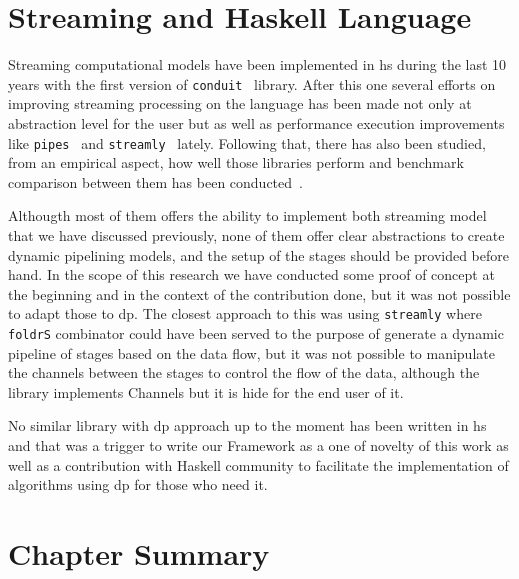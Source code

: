   

\section{Streaming and Haskell Language}
Streaming computational models have been implemented in \acrfull{hs} during the last 10 years with the first version of \texttt{conduit}~\cite{conduit} library.
After this one several efforts on improving streaming processing on the language has been made not only at abstraction level for the user but as well as performance execution 
improvements like \texttt{pipes}~\cite{pipes} and \texttt{streamly}~\cite{streamly} lately.
Following that, there has also been studied, from an empirical aspect, how well those libraries perform and benchmark comparison between them has been conducted~\cite{benchstreamhs}.

Althougth most of them offers the ability to implement both streaming model that we have discussed previously, none of them offer clear abstractions to create dynamic pipelining models, and
the setup of the stages should be provided before hand. In the scope of this research we have conducted some proof of concept at the beginning and in the context of the contribution done, 
but it was not possible to adapt those to \acrshort{dp}. The closest approach to this was using \texttt{streamly} where \texttt{foldrS} combinator
could have been served to the purpose of generate a dynamic pipeline of stages based on the data flow, but it was not possible to manipulate the channels between the stages to control the flow 
of the data, although the library implements Channels but it is hide for the end user of it.

No similar library with \acrshort{dp} approach up to the moment has been written in \acrlong{hs} and that was a trigger to write our Framework as a one of novelty of this work as well as a contribution
with Haskell community to facilitate the implementation of algorithms using \acrshort{dp} for those who need it.

\section{Chapter Summary}